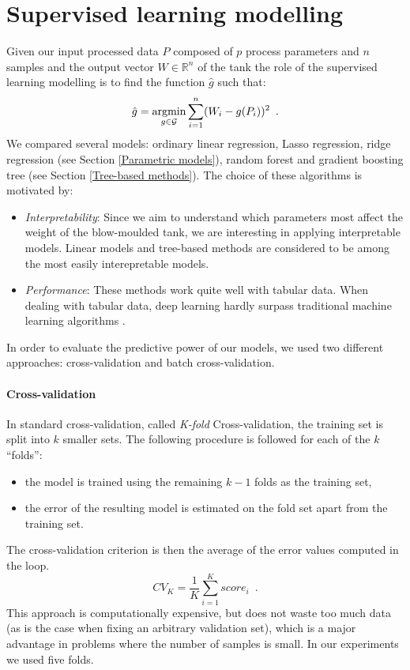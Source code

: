 \section{Supervised learning modelling}

Given our input processed data $P$ composed of $p$ process parameters and $n$ samples and the output vector $W \in \mathds{R}^{n}$ of the tank the role of the supervised learning modelling is to find the function $\hat{g}$ such that:
%
\begin{equation}
    \hat{g} = \operatorname*{argmin}_{g \in \mathcal{G}} \sum_{i=1}^n (W_{i} - g(P_{i}))^{2} \enspace.
\end{equation}
%
We compared several models: ordinary linear regression, Lasso regression, ridge regression (see Section \ref{Parametric models}), random forest and gradient boosting tree (see Section \ref{Tree-based methods}). The choice of these algorithms is motivated by:
%
\begin{itemize}
    \item \textit{Interpretability}: Since we aim to understand which parameters most affect the weight of the blow-moulded tank, we are interesting in applying interpretable models. Linear models and tree-based methods are considered to be among the most easily interepretable models.
    \item \textit{Performance}: These methods work quite well with tabular data. When dealing with tabular data, deep learning hardly surpass traditional machine learning algorithms \citep{shwartz2021tabular}. 
\end{itemize}
%
In order to evaluate the predictive power of our models, we used two different approaches: cross-validation and batch cross-validation. 

\paragraph{Cross-validation}

In standard cross-validation, called \textit{K-fold} Cross-validation, the training set is split into $k$ smaller sets. The following procedure is followed for each of the $k$ “folds”:
%
\begin{itemize}
    \item the model is trained using the remaining $k - 1$ folds as the training set,
    \item the error of the resulting model is estimated on the fold set apart from the training set.
\end{itemize}
%
The cross-validation criterion is then the average of the error values computed in the loop.
%
\begin{equation}
    CV_{K} = \frac{1}{K}\sum_{i=1}^{K}score_{i}
    \enspace.
\end{equation}
%
This approach is computationally expensive, but does not waste too much data (as is the case when fixing an arbitrary validation set), which is a major advantage in problems where the number of samples is small. In our experiments we used five folds.

